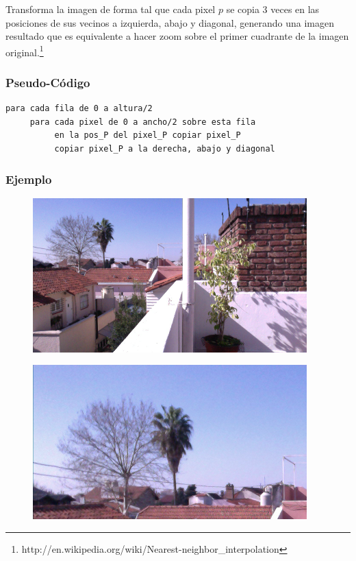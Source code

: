 Transforma la imagen de forma tal que cada pixel $p$ se copia 3 veces en las posiciones de sus vecinos a izquierda, abajo y diagonal, generando una imagen resultado que es equivalente a hacer zoom sobre el primer cuadrante de la imagen original.\footnote{http://en.wikipedia.org/wiki/Nearest-neighbor\_interpolation}
\subsubsection*{Pseudo-C\'odigo}
\begin{verbatim}
para cada fila de 0 a altura/2
     para cada pixel de 0 a ancho/2 sobre esta fila
          en la pos_P del pixel_P copiar pixel_P
          copiar pixel_P a la derecha, abajo y diagonal
\end{verbatim}
\subsubsection*{Ejemplo}
\begin{center}
  \begin{figure}[H]
  \includegraphics[scale=0.60]{imgs/stretch1.png}
  \end{figure}  
  \begin{figure}[H]
  \includegraphics[scale=0.60]{imgs/stretch2.png}
  \end{figure}  
\end{center}  

